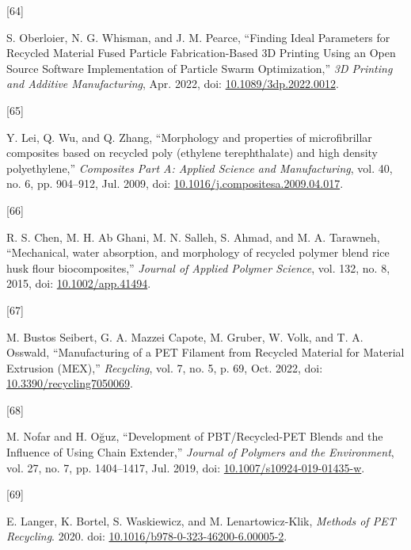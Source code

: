 \documentclass[
]{article}
\newlength{\cslhangindent}
\newlength{\csllabelwidth}
\newlength{\cslentryspacingunit} %
\newenvironment{CSLReferences}[2] %
 {%
  \setlength{\parindent}{0pt}
  \ifodd #1
  \let\oldpar\par
  \def\par{\hangindent=\cslhangindent\oldpar}
  \fi
  \setlength{\parskip}{#2\cslentryspacingunit}
 }%
 {}
\newcommand{\CSLLeftMargin}[1]{\parbox[t]{\csllabelwidth}{#1}}
\newcommand{\CSLRightInline}[1]{\parbox[t]{\linewidth - \csllabelwidth}{#1}\break}
\begin{document}
\begin{CSLReferences}{0}{0}
\leavevmode{}%
\CSLLeftMargin{{[}64{]} }%
\CSLRightInline{S. Oberloier, N. G. Whisman, and J. M. Pearce,
{``Finding {Ideal Parameters} for {Recycled Material Fused Particle
Fabrication-Based 3D Printing Using} an {Open Source Software
Implementation} of {Particle Swarm Optimization},''} \emph{3D Printing
and Additive Manufacturing}, Apr. 2022, doi:
\href{https://doi.org/10.1089/3dp.2022.0012}{10.1089/3dp.2022.0012}.}

\leavevmode{}%
\CSLLeftMargin{{[}65{]} }%
\CSLRightInline{Y. Lei, Q. Wu, and Q. Zhang, {``Morphology and
properties of microfibrillar composites based on recycled poly (ethylene
terephthalate) and high density polyethylene,''} \emph{Composites Part
A: Applied Science and Manufacturing}, vol. 40, no. 6, pp. 904--912,
Jul. 2009, doi:
\href{https://doi.org/10.1016/j.compositesa.2009.04.017}{10.1016/j.compositesa.2009.04.017}.}

\leavevmode{}%
\CSLLeftMargin{{[}66{]} }%
\CSLRightInline{R. S. Chen, M. H. Ab Ghani, M. N. Salleh, S. Ahmad, and
M. A. Tarawneh, {``Mechanical, water absorption, and morphology of
recycled polymer blend rice husk flour biocomposites,''} \emph{Journal
of Applied Polymer Science}, vol. 132, no. 8, 2015, doi:
\href{https://doi.org/10.1002/app.41494}{10.1002/app.41494}.}

\leavevmode{}%
\CSLLeftMargin{{[}67{]} }%
\CSLRightInline{M. Bustos Seibert, G. A. Mazzei Capote, M. Gruber, W.
Volk, and T. A. Osswald, {``Manufacturing of a {PET Filament} from
{Recycled Material} for {Material Extrusion} ({MEX}),''}
\emph{Recycling}, vol. 7, no. 5, p. 69, Oct. 2022, doi:
\href{https://doi.org/10.3390/recycling7050069}{10.3390/recycling7050069}.}

\leavevmode{}%
\CSLLeftMargin{{[}68{]} }%
\CSLRightInline{M. Nofar and H. Oğuz, {``Development of
{PBT}/{Recycled-PET Blends} and the {Influence} of {Using Chain
Extender},''} \emph{Journal of Polymers and the Environment}, vol. 27,
no. 7, pp. 1404--1417, Jul. 2019, doi:
\href{https://doi.org/10.1007/s10924-019-01435-w}{10.1007/s10924-019-01435-w}.}

\leavevmode{}%
\CSLLeftMargin{{[}69{]} }%
\CSLRightInline{E. Langer, K. Bortel, S. Waskiewicz, and M.
Lenartowicz-Klik, \emph{Methods of {PET Recycling}}. 2020. doi:
\href{https://doi.org/10.1016/b978-0-323-46200-6.00005-2}{10.1016/b978-0-323-46200-6.00005-2}.}


\end{CSLReferences}
\end{document}

